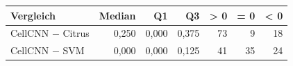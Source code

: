 \begin{tabular}{lrrrrrr}
\toprule
Vergleich & Median & Q1 & Q3 & > 0 & = 0 & < 0 \\
\midrule
CellCNN $-$ Citrus & 0,250 & 0,000 & 0,375 & 73 & 9 & 18 \\
CellCNN $-$ SVM & 0,000 & 0,000 & 0,125 & 41 & 35 & 24 \\
\bottomrule
\end{tabular}
